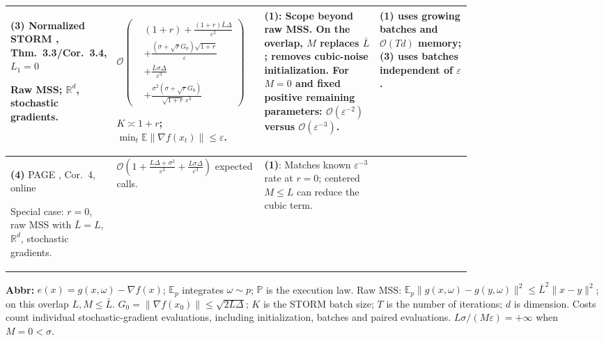 \begin{table}[tp]
\begin{threeparttable}
\begin{tabularx}{\linewidth}{@{}>{\raggedright\arraybackslash}p{0.20\linewidth}>{\raggedright\arraybackslash}p{0.32\linewidth}>{\raggedright\arraybackslash}p{0.25\linewidth}>{\raggedright\arraybackslash}X@{}}
\midrule
\textbf{(3)} Normalized STORM \citep{mrsnLiu2023v2}, Thm.~3.3/Cor.~3.4, $L_1=0$
\par Raw MSS; $\mathbb R^d$, stochastic gradients.
& $\mathcal{O}\!\left(\begin{aligned}&(1+r)+\frac{(1+r)\bar L\Delta}{\varepsilon^2}\\[-2pt]&+\frac{(\sigma+\sqrt rG_0)\sqrt{1+r}}{\varepsilon}\\[-2pt]&+\frac{\bar L\sigma\Delta}{\varepsilon^3}\\[-2pt]&+\frac{\sigma^2(\sigma+\sqrt rG_0)}{\sqrt{1+r}\,\varepsilon^3}\end{aligned}\right)$
\par $K\asymp1+r$; $\min_t\mathbb E\|\nabla f(x_t)\|\le\varepsilon$.
& \textbf{(1)}: Scope beyond raw MSS. On the overlap, $M$ replaces $\bar L$; removes cubic-noise initialization. For $M=0$ and fixed positive remaining parameters: $\mathcal{O}(\varepsilon^{-2})$ versus $\mathcal{O}(\varepsilon^{-3})$.
& \textbf{(1)} uses growing batches and $\mathcal{O}(Td)$ memory; \textbf{(3)} uses batches independent of $\varepsilon$. \\
\midrule
\textbf{(4)} PAGE \citep{mrsnLi2021}, Cor.~4, online
\par Special case: $r=0$, raw MSS with $\bar L=L$, $\mathbb R^d$, stochastic gradients.
& $\mathcal{O}\!\left(1+\frac{L\Delta+\sigma^2}{\varepsilon^2}+\frac{L\sigma\Delta}{\varepsilon^3}\right)$ expected calls.
& \textbf{(1)}: Matches known $\varepsilon^{-3}$ rate at $r=0$; centered $M\le L$ can reduce the cubic term. & \\
\bottomrule
\end{tabularx}
\begin{tablenotes}[flushleft]\footnotesize
\item[] \textbf{Abbr:} $e(x)=g(x,\omega)-\nabla f(x)$; $\mathbb E_p$ integrates $\omega\sim p$; $\mathbb P$ is the execution law. Raw MSS: $\mathbb E_p\|g(x,\omega)-g(y,\omega)\|^2\le\bar L^2\|x-y\|^2$; on this overlap $L,M\le\bar L$. $G_0=\|\nabla f(x_0)\|\le\sqrt{2L\Delta}$; $K$ is the STORM batch size; $T$ is the number of iterations; $d$ is dimension. Costs count individual stochastic-gradient evaluations, including initialization, batches and paired evaluations. $L\sigma/(M\varepsilon)=+\infty$ when $M=0<\sigma$.
\end{tablenotes}
\end{threeparttable}
\end{table}
\clearpage
